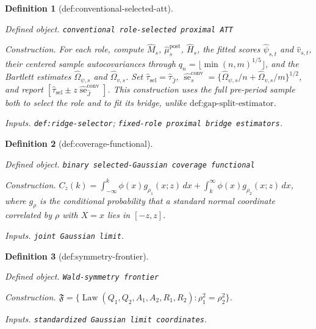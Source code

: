 \documentclass{article}
\newtheorem{definition}{Definition}
\begin{document}
\begin{definition}[def:conventional-selected-att]\label{def:conventional-selected-att}
\par\smallskip\noindent\emph{Defined object.} \texttt{conventional role-\allowbreak{}selected proximal ATT}
\par\smallskip\noindent\emph{Construction.} For each role, compute \(\widehat M_s\), \(\widehat\mu_s^{\mathrm{post}}\), \(\widehat H_s\), the fitted scores \(\widehat\psi_{s,t}\) and \(\widehat v_{s,t}\), their centered sample autocovariances through \(q_n=\lfloor\min(n,m)^{1/5}\rfloor\), and the Bartlett estimates \(\widehat\Omega_{\psi,s}\) and \(\widehat\Omega_{v,s}\). Set \(\widehat\tau_{\mathrm{sel}}=\widehat\tau_{\widehat J}\), \(\widehat{\operatorname{se}}^{\mathrm{conv}}_s=\{\widehat\Omega_{\psi,s}/n+\widehat\Omega_{v,s}/m\}^{1/2}\), and report \([\widehat\tau_{\mathrm{sel}}\pm z\widehat{\operatorname{se}}^{\mathrm{conv}}_{\widehat J}]\). This construction uses the full pre-period sample both to select the role and to fit its bridge, unlike \(\text{def:gap-split-estimator}\).
\par\smallskip\noindent\emph{Inputs.} \texttt{def:\allowbreak{}ridge-\allowbreak{}selector}; \texttt{fixed-\allowbreak{}role proximal bridge estimators}.
\end{definition}

\begin{definition}[def:coverage-functional]\label{def:coverage-functional}
\par\smallskip\noindent\emph{Defined object.} \texttt{binary selected-\allowbreak{}Gaussian coverage functional}
\par\smallskip\noindent\emph{Construction.} \(C_z(k)=\int_{-\infty}^{k}\phi(x)g_{\rho_1}(x;z)\,dx+\int_k^{\infty}\phi(x)g_{\rho_2}(x;z)\,dx\), where \(g_{\rho}\) is the conditional probability that a standard normal coordinate correlated by \(\rho\) with \(X=x\) lies in \([-z,z]\).
\par\smallskip\noindent\emph{Inputs.} \texttt{joint Gaussian limit}.
\end{definition}

\begin{definition}[def:symmetry-frontier]\label{def:symmetry-frontier}
\par\smallskip\noindent\emph{Defined object.} \texttt{Wald-\allowbreak{}symmetry frontier}
\par\smallskip\noindent\emph{Construction.} \(\mathfrak F=\{\operatorname{Law}(Q_1,Q_2,A_1,A_2,R_1,R_2):\rho_1^2=\rho_2^2\}\).
\par\smallskip\noindent\emph{Inputs.} \texttt{standardized Gaussian limit coordinates}.
\end{definition}
\end{document}
